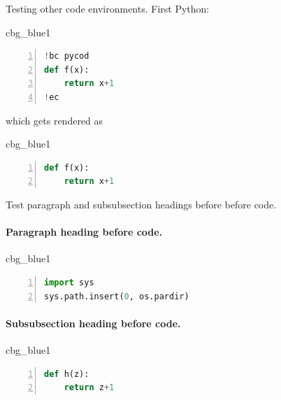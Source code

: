 \n\documentclass[%
oneside,                 %
final,                   %
10pt]{article}
\newenvironment{_cod_tight}[1]{
   \def\FrameCommand{\colorbox{#1}}
   \FrameRule0.6pt\MakeFramed {\FrameRestore}\vskip3mm}
   {\vskip0mm\endMakeFramed}
\newenvironment{cod}[1]{
\bgroup\rmfamily
\fboxsep=0mm\relax
\begin{_cod_tight}{#1}
\list{}{\parsep=-2mm\parskip=0mm\topsep=0pt\leftmargin=2mm
\rightmargin=2\leftmargin\leftmargin=4pt\relax}
\item\relax}
{\endlist\end{_cod_tight}\egroup}
\theoremstyle{definition}
\begin{document}
Testing other code environments. First Python:






\begin{cod}{cbg_blue1}\begin{lstlisting}[language=Python,style=myspeciallststyle,numbers=left,numberstyle=\tiny,stepnumber=3,numbersep=15pt,xleftmargin=1mm]
!bc pycod
def f(x):
    return x+1
!ec

\end{lstlisting}\end{cod}
\noindent

which gets rendered as




\begin{cod}{cbg_blue1}\begin{lstlisting}[language=Python,style=myspeciallststyle,numbers=left,numberstyle=\tiny,stepnumber=3,numbersep=15pt,xleftmargin=1mm]
def f(x):
    return x+1

\end{lstlisting}\end{cod}
\noindent


Test paragraph and subsubsection headings before
before code.

\paragraph{Paragraph heading before code.}




\begin{cod}{cbg_blue1}\begin{lstlisting}[language=Python,style=myspeciallststyle,numbers=left,numberstyle=\tiny,stepnumber=3,numbersep=15pt,xleftmargin=1mm]
import sys
sys.path.insert(0, os.pardir)

\end{lstlisting}\end{cod}
\noindent


\paragraph{Subsubsection heading before code.}



\begin{cod}{cbg_blue1}\begin{lstlisting}[language=Python,style=myspeciallststyle,numbers=left,numberstyle=\tiny,stepnumber=3,numbersep=15pt,xleftmargin=1mm]
def h(z):
    return z+1

\end{lstlisting}\end{cod}
\noindent
\end{document}
